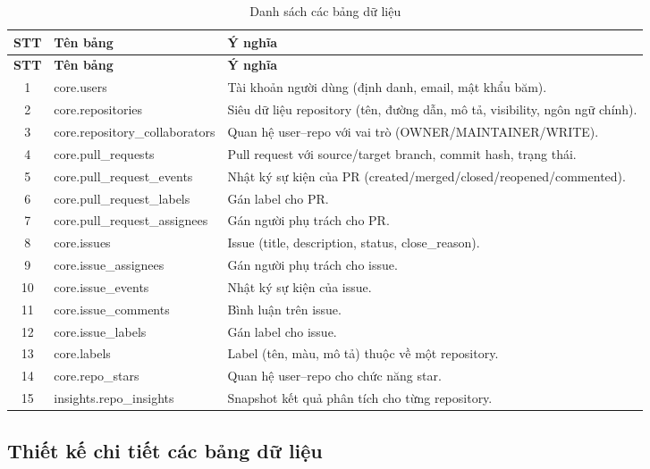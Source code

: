 \begin{longtable}{|c|>{\ttfamily\small}p{5.0cm}|p{7.0cm}|}
\caption{Danh sách các bảng dữ liệu}\label{tab:tablelist}\\
\hline\rowcolor{sgCream}\textbf{STT} & \normalfont\textbf{Tên bảng} & \textbf{Ý nghĩa}\\\hline\endfirsthead
\hline\rowcolor{sgCream}\textbf{STT} & \normalfont\textbf{Tên bảng} & \textbf{Ý nghĩa}\\\hline\endhead
1  & core.users & Tài khoản người dùng (định danh, email, mật khẩu băm).\\\hline
2  & core.repositories & Siêu dữ liệu repository (tên, đường dẫn, mô tả, visibility, ngôn ngữ chính).\\\hline
3  & core.repository\_collaborators & Quan hệ user--repo với vai trò (OWNER/MAINTAINER/WRITE).\\\hline
4  & core.pull\_requests & Pull request với source/target branch, commit hash, trạng thái.\\\hline
5  & core.pull\_request\_events & Nhật ký sự kiện của PR (created/merged/closed/reopened/commented).\\\hline
6  & core.pull\_request\_labels & Gán label cho PR.\\\hline
7  & core.pull\_request\_assignees & Gán người phụ trách cho PR.\\\hline
8  & core.issues & Issue (title, description, status, close\_reason).\\\hline
9  & core.issue\_assignees & Gán người phụ trách cho issue.\\\hline
10 & core.issue\_events & Nhật ký sự kiện của issue.\\\hline
11 & core.issue\_comments & Bình luận trên issue.\\\hline
12 & core.issue\_labels & Gán label cho issue.\\\hline
13 & core.labels & Label (tên, màu, mô tả) thuộc về một repository.\\\hline
14 & core.repo\_stars & Quan hệ user--repo cho chức năng star.\\\hline
15 & insights.repo\_insights & Snapshot kết quả phân tích cho từng repository.\\\hline
\end{longtable}

\subsection{Thiết kế chi tiết các bảng dữ liệu}\label{sec:dbdetail}


